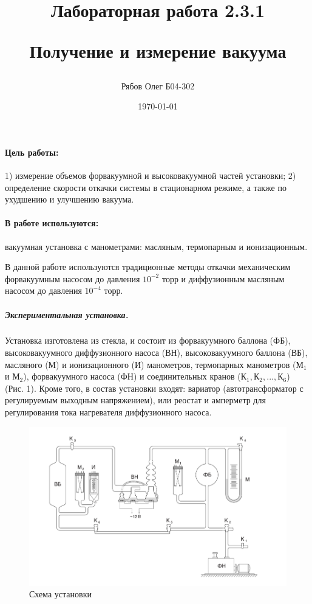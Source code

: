 \documentclass[a4paper,12pt]{article}
\author{Рябов Олег Б04-302}
\title{Лабораторная работа 2.3.1
	
Получение и измерение вакуума}
\date{\today}
\begin{document}
\maketitle

\newpage

\paragraph{Цель работы:} 
1) измерение объемов форвакуумной и высоковакуумной частей установки;
2) определение скорости откачки системы в стационарном режиме, а также по ухудшению и улучшению вакуума.
\paragraph{В работе используются:} вакуумная установка с манометрами: масляным, термопарным и ионизационным.




В данной работе используются традиционные методы откачки механическим форвакуумным насосом до давления $10^{-2}$ торр и диффузионным масляным насосом до давления $10^{-4}$ торр. 


\subparagraph*{Экспериментальная установка.} 
 	Установка изготовлена из стекла,
 и состоит из форвакуумного баллона (ФБ), высоковакуумного диффузионного насоса (ВН), высоковакуумного баллона (ВБ), масляного (М) и ионизационного (И) манометров, термопарных манометров ($\text{М}_1$ и $\text{М}_2$), форвакуумного насоса (ФН) и соединительных кранов ($К_1, К_2,..., К_6$) (Рис. 1). Кроме того, в состав установки входят: вариатор (автотрансформатор с регулируемым выходным напряжением), или реостат и амперметр для регулирования тока нагревателя диффузионного насоса. \\
  \begin{figure}[h]
 	\centering
 	\includegraphics[width=0.7 \textheight]{../pictures/1.jpg}
 	\caption{Схема установки}
 	\label{fig:Схема установки}
 \end{figure}
\end{document}
